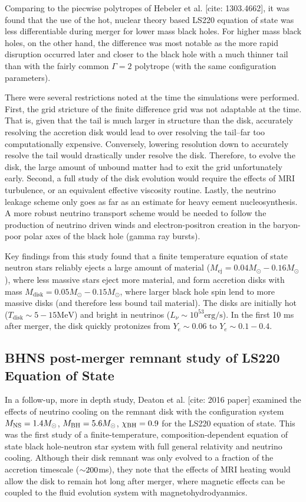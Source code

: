 Comparing to the piecwise polytropes of Hebeler et al. [cite: 1303.4662], it was found that the use of the hot, nuclear theory based LS220 equation of state was less differentiable during merger for lower mass black holes.  For higher mass black holes, on the other hand, the difference was most notable as the more rapid disruption occurred later and closer to the black hole with a much thinner tail than with the fairly common $\Gamma = 2$ polytrope (with the same configuration parameters).

There were several restrictions noted at the time the simulations were performed.  First, the grid stricture of the finite difference grid was not adaptable at the time.  That is, given that the tail is much larger in structure than the disk, accurately resolving the accretion disk would lead to over resolving the tail--far too computationally expensive.  Conversely, lowering resolution down to accurately resolve the tail would drastically under resolve the disk.  Therefore, to evolve the disk, the large amount of unbound matter had to exit the grid unfortunately early.  Second, a full study of the disk evolution would require the effects of MRI turbulence, or an equivalent effective viscosity routine.   Lastly, the neutrino leakage scheme only goes as far as an estimate for heavy eement nucleosynthesis.  A more robust neutrino transport scheme would be needed to follow the production of neutrino driven winds and electron-positron creation in the baryon-poor polar axes of the black hole (gamma ray bursts).

Key findings from this study found that a finite temperature equation of state neutron stars reliably ejects a large amount of material ($M_\textrm{ej} = 0.04 M_\odot -  0.16 M_\odot$), where less massive stars eject more material, and form accretion disks with mass $M_\textrm{disk} = 0.05 M_\odot -  0.15 M_\odot$, where larger black hole spin lend to more massive disks (and therefore less bound tail material).  The disks are initially hot ($T_\textrm{disk} \sim 5-15 \textrm{MeV}$) and bright in neutrinos ($L_\nu \sim 10^{53} \textrm{erg/s}$).  In the first 10 ms after merger, the disk quickly protonizes from $Y_e \sim 0.06$ to $Y_e \sim 0.1 - 0.4$. 

\subsection{BHNS post-merger remnant study of LS220 Equation of State}

In a follow-up, more in depth study, Deaton et al. [cite: 2016 paper] examined the effects of neutrino cooling on the remnant disk with the configuration system $M_{\rm NS} = 1.4 M_\odot$, $M_{\rm BH} = 5.6 M_\odot$, $\chi_{\rm BH} = 0.9$ for the LS220 equation of state.  This was the first study of a finite-temperature, composition-dependent equation of state black hole-neutron star system with full general relativity and neutrino cooling.  Although their disk remnant was only evolved to a fraction of the accretion timescale ($\mathord{\sim} 200$ms), they note that the effects of MRI heating would allow the disk to remain hot long after merger, where magnetic effects can be coupled to the fluid evolution system with magnetohydrodyanmics.



